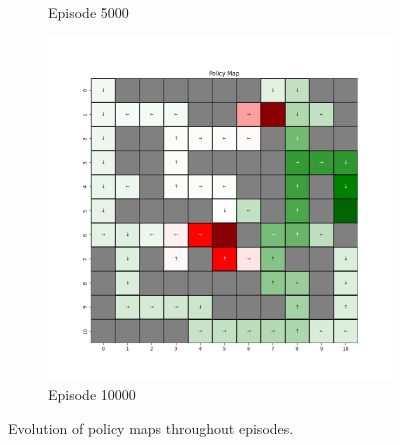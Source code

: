 \documentclass{assignment}
\begin{document}
\begin{figure}[H]
\begin{subfigure}{0.3\textwidth}
    \caption{Episode 5000}
    \end{subfigure}\hfill
    \begin{subfigure}{0.3\textwidth}
        \includegraphics[width=\textwidth]{figures/policy_td/epsilon_sweep/policy_alpha_0.1_gamma_0.95_epsilon_0.0_iteration_10000.png}
    \caption{Episode 10000}
    \end{subfigure}
    \caption{Evolution of policy maps throughout episodes.}
    \label{fig:epsilon_0.0_td_learning_policy}
\end{figure}
\end{document}
